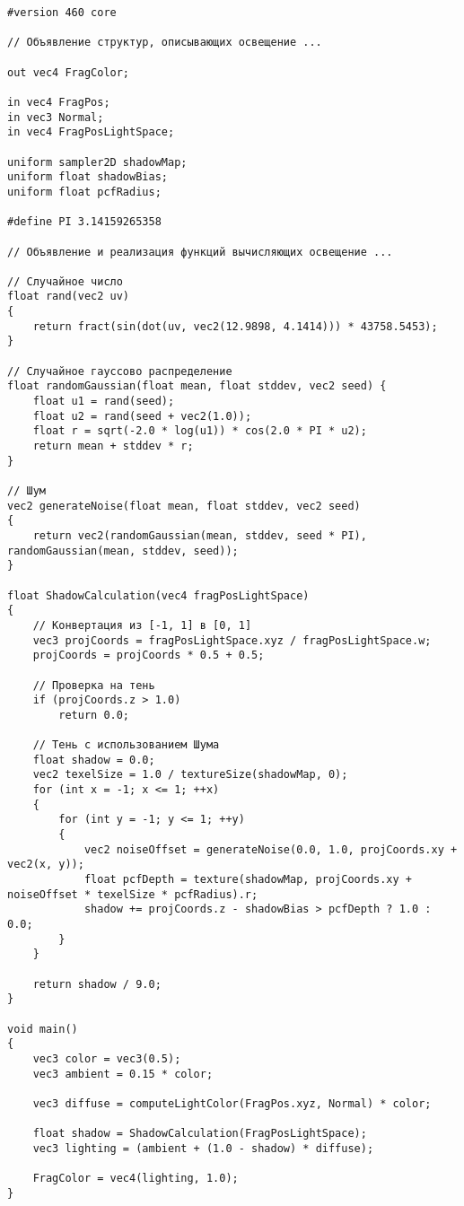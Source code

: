\begin{center}
\captionsetup{justification=centering, singlelinecheck=off}
\begin{lstlisting}[label=lst:shadow_map_noise_frag, caption=Фрагментный шейдер с учетом перспективного проецирония теней]
#version 460 core

// Объявление структур, описывающих освещение ...

out vec4 FragColor;

in vec4 FragPos;
in vec3 Normal;
in vec4 FragPosLightSpace;

uniform sampler2D shadowMap;
uniform float shadowBias;
uniform float pcfRadius;

#define PI 3.14159265358

// Объявление и реализация функций вычисляющих освещение ...

// Случайное число
float rand(vec2 uv)
{
    return fract(sin(dot(uv, vec2(12.9898, 4.1414))) * 43758.5453);
}

// Случайное гауссово распределение
float randomGaussian(float mean, float stddev, vec2 seed) {
    float u1 = rand(seed);
    float u2 = rand(seed + vec2(1.0));
    float r = sqrt(-2.0 * log(u1)) * cos(2.0 * PI * u2);
    return mean + stddev * r;
}

// Шум
vec2 generateNoise(float mean, float stddev, vec2 seed)
{
    return vec2(randomGaussian(mean, stddev, seed * PI), randomGaussian(mean, stddev, seed));
}

float ShadowCalculation(vec4 fragPosLightSpace)
{
    // Конвертация из [-1, 1] в [0, 1]
    vec3 projCoords = fragPosLightSpace.xyz / fragPosLightSpace.w;
    projCoords = projCoords * 0.5 + 0.5;

    // Проверка на тень
    if (projCoords.z > 1.0)
        return 0.0;
    
    // Тень с использованием Шума
    float shadow = 0.0;
    vec2 texelSize = 1.0 / textureSize(shadowMap, 0);
    for (int x = -1; x <= 1; ++x)
    {
        for (int y = -1; y <= 1; ++y)
        {
            vec2 noiseOffset = generateNoise(0.0, 1.0, projCoords.xy + vec2(x, y));
            float pcfDepth = texture(shadowMap, projCoords.xy + noiseOffset * texelSize * pcfRadius).r;
            shadow += projCoords.z - shadowBias > pcfDepth ? 1.0 : 0.0;
        }
    }

    return shadow / 9.0;
}

void main()
{
    vec3 color = vec3(0.5);
    vec3 ambient = 0.15 * color;

    vec3 diffuse = computeLightColor(FragPos.xyz, Normal) * color;

    float shadow = ShadowCalculation(FragPosLightSpace);                      
    vec3 lighting = (ambient + (1.0 - shadow) * diffuse);

    FragColor = vec4(lighting, 1.0);
}
\end{lstlisting}
\end{center}

